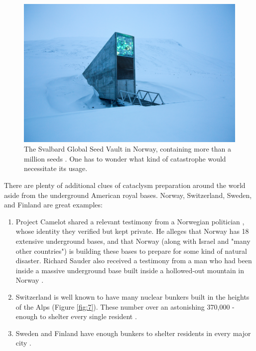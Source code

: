 \documentclass[10pt,twocolumn,letterpaper]{article}
\begin{document}
\begin{figure}[t]
\begin{center}
   \includegraphics[width=1\linewidth]{svalbard.jpg}
\end{center}
   \caption{The Svalbard Global Seed Vault in Norway, containing more than a million seeds \cite{24}. One has to wonder what kind of catastrophe would necessitate its usage.}
\label{fig:8}
\label{fig:onecol}
\end{figure}

There are plenty of additional clues of cataclysm preparation around the world aside from the underground American royal bases. Norway, Switzerland, Sweden, and Finland are great examples:

\begin{flushleft}
\begin{enumerate}
    \item Project Camelot shared a relevant testimony from a Norwegian politician \cite{25,26}, whose identity they verified but kept private. He alleges that Norway has 18 extensive underground bases, and that Norway (along with Israel and "many other countries") is building these bases to prepare for some kind of natural disaster. Richard Sauder also received a testimony from a man who had been inside a massive underground base built inside a hollowed-out mountain in Norway \cite{22}.
    \item Switzerland is well known to have many nuclear bunkers built in the heights of the Alps (Figure \ref{fig:7}). These number over an astonishing 370,000 - enough to shelter every single resident \cite{27}.
    \item Sweden and Finland have enough bunkers to shelter residents in every major city \cite{27}. 
\end{enumerate}
\end{flushleft}
\end{document}
